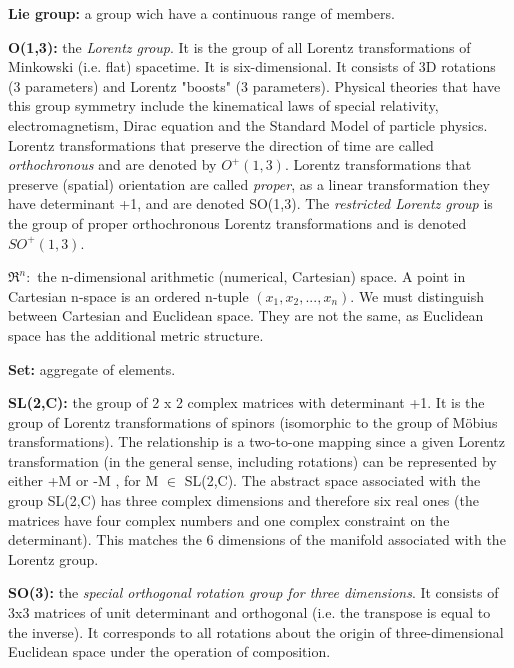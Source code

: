 \begin{list}{}{}
	\item \textbf{Lie group:} a group wich have a continuous range of members.

	\item \textbf{O(1,3):} the \emph{Lorentz group}. It is the group of all Lorentz transformations of Minkowski (i.e. flat) spacetime. It is six-dimensional. It consists of 3D rotations (3 parameters) and Lorentz "boosts" (3 parameters). Physical theories that have this group symmetry include the kinematical laws of special relativity, electromagnetism, Dirac equation and the Standard Model of particle physics. Lorentz transformations that preserve the direction of time are called \emph{orthochronous} and are denoted by $O^+(1,3)$. Lorentz transformations that preserve (spatial) orientation are called \emph{proper}, as a linear transformation they have determinant +1, and are denoted SO(1,3). The \emph{restricted Lorentz group} is the group of proper orthochronous Lorentz transformations and is denoted $SO^+(1,3)$.
	
	\item $\Re^n:$ the n-dimensional arithmetic (numerical, Cartesian) space. A point in Cartesian n-space is an ordered n-tuple $(x_1,x_2,...,x_n)$. We must distinguish between Cartesian and Euclidean space. They are not the same, as Euclidean space has the additional metric structure.
	
	\item \textbf{Set:} aggregate of elements.
	
	\item \textbf{SL(2,C):} the group of 2 x 2 complex matrices with determinant +1. It is the group of Lorentz transformations of spinors (isomorphic to the group of Möbius transformations). The relationship is a two-to-one mapping since a given Lorentz transformation (in the general sense, including rotations) can be represented by either +M or -M , for M $\in$ SL(2,C). The abstract space associated with the group SL(2,C) has three complex dimensions and therefore six real ones (the matrices have four complex numbers and one complex constraint on the determinant). This matches the 6 dimensions of the manifold associated with the Lorentz group.
	
	\item \textbf{SO(3):} the \emph{special orthogonal rotation group for three dimensions}. It consists of 3x3 matrices of unit determinant and orthogonal (i.e. the transpose is equal to the inverse). It corresponds to all rotations about the origin of three-dimensional Euclidean space under the operation of composition.
	

\end{list}
